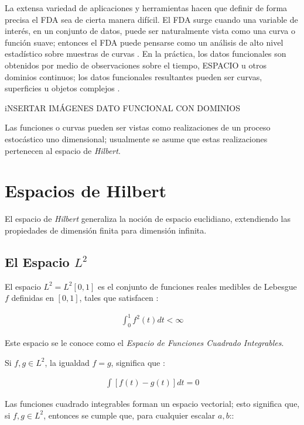 \documentclass[
]{book}
\begin{document}
La extensa variedad de aplicaciones y herramientas hacen que definir de forma precisa el FDA sea de cierta manera difícil. El FDA surge cuando una variable de interés, en un conjunto de datos, puede ser naturalmente vista como una curva o función suave; entonces el FDA puede pensarse como un análisis de alto nivel estadístico sobre muestras de curvas \citep{kokoska}. En la práctica, los datos funcionales son obtenidos por medio de observaciones sobre el tiempo, {ESPACIO} u otros dominios continuos; los datos funcionales resultantes pueden ser curvas, superficies u objetos complejos \citep{jin}.

{iNSERTAR IMÁGENES DATO FUNCIONAL CON DOMINIOS}

Las funciones o curvas pueden ser vistas como realizaciones de un proceso estocástico uno dimensional; usualmente se asume que estas realizaciones pertenecen al espacio de \emph{Hilbert}.\\

\hypertarget{espacios-de-hilbert}{%
\section{Espacios de Hilbert}\label{espacios-de-hilbert}}

El espacio de \emph{Hilbert} generaliza la noción de espacio euclidiano, extendiendo las propiedades de dimensión finita para dimensión infinita.

\hypertarget{el-espacio-l2}{%
\subsection{\texorpdfstring{\textbf{El Espacio} \(L^2\)}{El Espacio L\^{}2}}\label{el-espacio-l2}}

El espacio \(L^2=L^2[0,1]\) es el conjunto de funciones reales medibles de Lebesgue \(f\) definidas en \([0,1]\), tales que satisfacen \citep{lajos}:

\begin{align}
    \int_0^1 f^2(t)dt<\infty
\end{align}

Este espacio se le conoce como el \emph{Espacio de Funciones Cuadrado Integrables}.

Si \(f,g \in L^2\), la igualdad \(f=g\), significa que \citep{kokoska}:

\begin{align}
    \int[f(t)-g(t)]dt=0
\end{align}

Las funciones cuadrado integrables forman un espacio vectorial; esto significa que, si \(f,g\in L^2\), entonces se cumple que, para cualquier escalar \(a,b\)::
\end{document}
